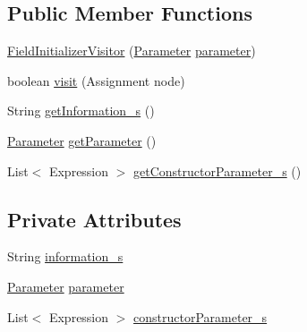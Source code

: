 \subsection*{Public Member Functions}
\begin{DoxyCompactItemize}
\item 
\hyperlink{classit_1_1isislab_1_1masonassisteddocumentation_1_1visitor_1_1_field_initializer_visitor_acca71efb4c53b8e1e57cd90e0b67b8ec}{Field\-Initializer\-Visitor} (\hyperlink{classit_1_1isislab_1_1masonassisteddocumentation_1_1mason_1_1analizer_1_1_parameter}{Parameter} \hyperlink{classit_1_1isislab_1_1masonassisteddocumentation_1_1visitor_1_1_field_initializer_visitor_a2eee2343f9012365b49aebbebe61d79d}{parameter})
\item 
boolean \hyperlink{classit_1_1isislab_1_1masonassisteddocumentation_1_1visitor_1_1_field_initializer_visitor_acb95069b68c5f22706789201cd5645b6}{visit} (Assignment node)
\item 
String \hyperlink{classit_1_1isislab_1_1masonassisteddocumentation_1_1visitor_1_1_field_initializer_visitor_ad3d228ab01a76c32c2cc871109ba2bf8}{get\-Information\-\_\-s} ()
\item 
\hyperlink{classit_1_1isislab_1_1masonassisteddocumentation_1_1mason_1_1analizer_1_1_parameter}{Parameter} \hyperlink{classit_1_1isislab_1_1masonassisteddocumentation_1_1visitor_1_1_field_initializer_visitor_a06f228e398c0238cfe85a5d41bb06ace}{get\-Parameter} ()
\item 
List$<$ Expression $>$ \hyperlink{classit_1_1isislab_1_1masonassisteddocumentation_1_1visitor_1_1_field_initializer_visitor_a8ecc25c4593215c6f721f1cf552bcc53}{get\-Constructor\-Parameter\-\_\-s} ()
\end{DoxyCompactItemize}
\subsection*{Private Attributes}
\begin{DoxyCompactItemize}
\item 
String \hyperlink{classit_1_1isislab_1_1masonassisteddocumentation_1_1visitor_1_1_field_initializer_visitor_aee70f4a93ab159d0895d6d37b0028144}{information\-\_\-s}
\item 
\hyperlink{classit_1_1isislab_1_1masonassisteddocumentation_1_1mason_1_1analizer_1_1_parameter}{Parameter} \hyperlink{classit_1_1isislab_1_1masonassisteddocumentation_1_1visitor_1_1_field_initializer_visitor_a2eee2343f9012365b49aebbebe61d79d}{parameter}
\item 
List$<$ Expression $>$ \hyperlink{classit_1_1isislab_1_1masonassisteddocumentation_1_1visitor_1_1_field_initializer_visitor_abeb9a316d533f971cc30bfe5af74f3ad}{constructor\-Parameter\-\_\-s}
\end{DoxyCompactItemize}


